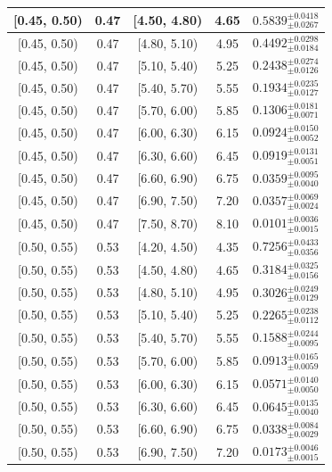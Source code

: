 \begin{longtable}{|c|c|c|c|c|}
\hline
[0.45, 0.50) & 0.47 & [4.50, 4.80) & 4.65 & $0.5839^{ \pm 0.0418 }_{ \pm 0.0267 }$ \\ 
\hline
[0.45, 0.50) & 0.47 & [4.80, 5.10) & 4.95 & $0.4492^{ \pm 0.0298 }_{ \pm 0.0184 }$ \\ 
\hline
[0.45, 0.50) & 0.47 & [5.10, 5.40) & 5.25 & $0.2438^{ \pm 0.0274 }_{ \pm 0.0126 }$ \\ 
\hline
[0.45, 0.50) & 0.47 & [5.40, 5.70) & 5.55 & $0.1934^{ \pm 0.0235 }_{ \pm 0.0127 }$ \\ 
\hline
[0.45, 0.50) & 0.47 & [5.70, 6.00) & 5.85 & $0.1306^{ \pm 0.0181 }_{ \pm 0.0071 }$ \\ 
\hline
[0.45, 0.50) & 0.47 & [6.00, 6.30) & 6.15 & $0.0924^{ \pm 0.0150 }_{ \pm 0.0052 }$ \\ 
\hline
[0.45, 0.50) & 0.47 & [6.30, 6.60) & 6.45 & $0.0919^{ \pm 0.0131 }_{ \pm 0.0051 }$ \\ 
\hline
[0.45, 0.50) & 0.47 & [6.60, 6.90) & 6.75 & $0.0359^{ \pm 0.0095 }_{ \pm 0.0040 }$ \\ 
\hline
[0.45, 0.50) & 0.47 & [6.90, 7.50) & 7.20 & $0.0357^{ \pm 0.0069 }_{ \pm 0.0024 }$ \\ 
\hline
[0.45, 0.50) & 0.47 & [7.50, 8.70) & 8.10 & $0.0101^{ \pm 0.0036 }_{ \pm 0.0015 }$ \\ 
\hline
[0.50, 0.55) & 0.53 & [4.20, 4.50) & 4.35 & $0.7256^{ \pm 0.0433 }_{ \pm 0.0356 }$ \\ 
\hline
[0.50, 0.55) & 0.53 & [4.50, 4.80) & 4.65 & $0.3184^{ \pm 0.0325 }_{ \pm 0.0156 }$ \\ 
\hline
[0.50, 0.55) & 0.53 & [4.80, 5.10) & 4.95 & $0.3026^{ \pm 0.0249 }_{ \pm 0.0129 }$ \\ 
\hline
[0.50, 0.55) & 0.53 & [5.10, 5.40) & 5.25 & $0.2265^{ \pm 0.0238 }_{ \pm 0.0112 }$ \\ 
\hline
[0.50, 0.55) & 0.53 & [5.40, 5.70) & 5.55 & $0.1588^{ \pm 0.0244 }_{ \pm 0.0095 }$ \\ 
\hline
[0.50, 0.55) & 0.53 & [5.70, 6.00) & 5.85 & $0.0913^{ \pm 0.0165 }_{ \pm 0.0059 }$ \\ 
\hline
[0.50, 0.55) & 0.53 & [6.00, 6.30) & 6.15 & $0.0571^{ \pm 0.0140 }_{ \pm 0.0050 }$ \\ 
\hline
[0.50, 0.55) & 0.53 & [6.30, 6.60) & 6.45 & $0.0645^{ \pm 0.0135 }_{ \pm 0.0040 }$ \\ 
\hline
[0.50, 0.55) & 0.53 & [6.60, 6.90) & 6.75 & $0.0338^{ \pm 0.0084 }_{ \pm 0.0029 }$ \\ 
\hline
[0.50, 0.55) & 0.53 & [6.90, 7.50) & 7.20 & $0.0173^{ \pm 0.0046 }_{ \pm 0.0015 }$ \\ 

\end{longtable}
